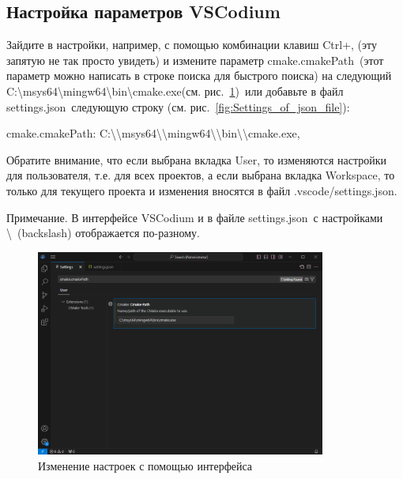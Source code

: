 \documentclass[a4paper,12pt]{article}
\begin{document}
        
        \subsection{ Настройка параметров VSCodium}
        
        Зайдите в настройки, например, с помощью комбинации клавиш Ctrl+, (эту запятую не так просто увидеть) и измените параметр \textquotedbl cmake.cmakePath\textquotedbl \ (этот параметр можно написать в строке поиска для быстрого поиска) на следующий \textquotedbl C:\textbackslash msys64\textbackslash mingw64\textbackslash bin\textbackslash cmake.exe\textquotedbl (см. рис.~\ref{fig:Settings_of_interface})\ или добавьте в файл \textquotedbl settings.json\textquotedbl \ следующую строку (см. рис.~\ref{fig:Settings_of_json_file}):

        \textquotedbl cmake.cmakePath\textquotedbl: \textquotedbl C:\textbackslash\textbackslash msys64\textbackslash\textbackslash mingw64\textbackslash\textbackslash bin\textbackslash\textbackslash cmake.exe\textquotedbl,
    
        Обратите внимание, что если выбрана вкладка User, то изменяются настройки для пользователя, т.е. для всех проектов, а если выбрана вкладка Workspace, то только для текущего проекта и изменения вносятся в файл \textquotedbl .vscode/settings.json\textquotedbl.
        
        Примечание. 
        В интерфейсе VSCodium и в файле \textquotedbl settings.json\textquotedbl \ с настройками \textbackslash ~(backslash) отображается по-разному.
        
        \begin{figure}[H]
            \centering
			\includegraphics[width=0.85\textwidth]{images/Settings_of_interface.png}
			\caption {Изменение настроек с помощью интерфейса}
            \label{fig:Settings_of_interface}
        \end{figure}
        
\end{document}
